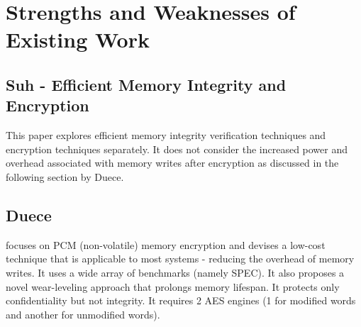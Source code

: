 \section{Strengths and Weaknesses of Existing Work}
\label{sec-discussions}

\subsection{Suh - Efficient Memory Integrity and Encryption}
This paper explores efficient memory integrity verification techniques and
encryption techniques separately. It does not consider the increased power and
overhead associated with memory writes after encryption as discussed in the
following section by Duece.

\subsection{Duece}
\cite{duece} focuses on PCM (non-volatile) memory encryption and devises a
low-cost technique that is applicable to most systems - reducing the overhead
of memory writes. It uses a wide array of benchmarks (namely SPEC). It also
proposes a novel wear-leveling approach that prolongs memory lifespan. It
protects only confidentiality but not integrity. It requires 2 AES engines (1
for modified words and another for unmodified words).
